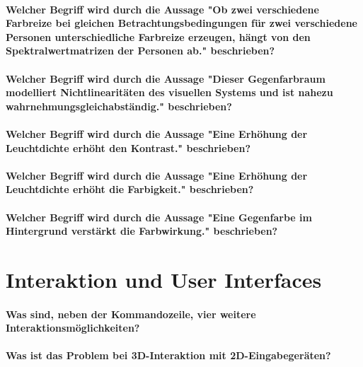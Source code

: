 \paragraph{Welcher Begriff wird durch die Aussage "Ob zwei verschiedene Farbreize bei gleichen Betrachtungsbedingungen für zwei verschiedene Personen unterschiedliche Farbreize erzeugen, hängt von den Spektralwertmatrizen der Personen ab." beschrieben?}

\paragraph{Welcher Begriff wird durch die Aussage "Dieser Gegenfarbraum modelliert Nichtlinearitäten des visuellen Systems und ist nahezu wahrnehmungsgleichabständig." beschrieben?}

\paragraph{Welcher Begriff wird durch die Aussage "Eine Erhöhung der Leuchtdichte erhöht den Kontrast." beschrieben?}

\paragraph{Welcher Begriff wird durch die Aussage "Eine Erhöhung der Leuchtdichte erhöht die Farbigkeit." beschrieben?}

\paragraph{Welcher Begriff wird durch die Aussage "Eine Gegenfarbe im Hintergrund verstärkt die Farbwirkung." beschrieben?}

\section{Interaktion und User Interfaces}
\paragraph{Was sind, neben der Kommandozeile, vier weitere Interaktionsmöglichkeiten?}

\paragraph{Was ist das Problem bei 3D-Interaktion mit 2D-Eingabegeräten?}


